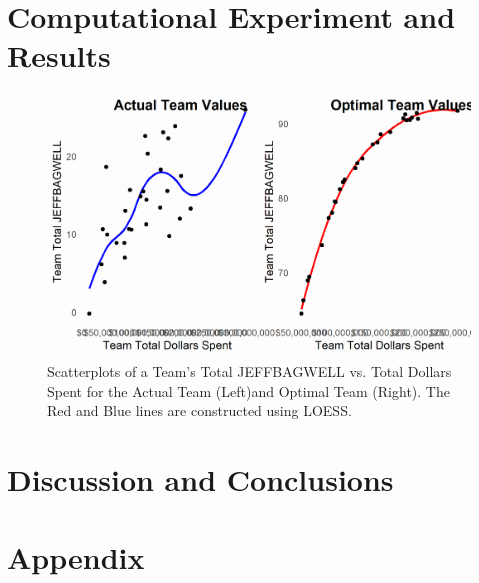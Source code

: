 \documentclass{article}
\begin{document}
\section{Computational Experiment and Results}



\begin{figure}[h]
\caption{Scatterplots of a Team's Total JEFFBAGWELL vs. Total Dollars Spent for the Actual Team (Left)and Optimal Team (Right). The Red and Blue lines are constructed using LOESS.} 
\label{fig:cowplot}
\centering
\includegraphics[width=0.7\paperwidth, scale=1.25]{bwar_salary_scatter_cowplot.png}
\end{figure}


%

\section{Discussion and Conclusions}


%
%

\section{Appendix}
\end{document}
